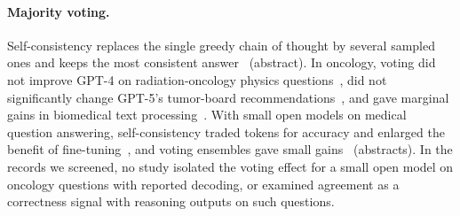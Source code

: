 \paragraph{Majority voting.} Self-consistency replaces the single greedy chain of thought by several sampled ones and
keeps the most consistent answer~\cite{wang2022selfconsistency} (abstract). In oncology, voting did not improve GPT-4
on radiation-oncology physics questions~\cite{holmes2023}, did not significantly change GPT-5's tumor-board
recommendations~\cite{stifini2026}, and gave marginal gains in biomedical text processing~\cite{windisch2026}. With
small open models on medical question answering, self-consistency traded tokens for accuracy and enlarged the benefit of
fine-tuning~\cite{bhattacharyya2026}, and voting ensembles gave small gains~\cite{zhan2026} (abstracts). In the records
we screened, no study isolated the voting effect for a small open model on oncology questions with reported decoding,
or examined agreement as a correctness signal with reasoning outputs on such questions.
